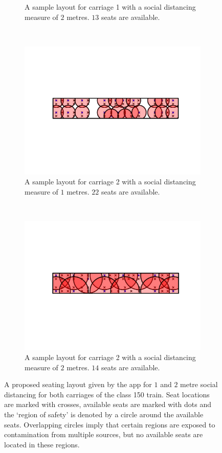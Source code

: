 \documentclass[11pt,a4paper]{article}
\begin{document}
\begin{figure}[ht!]
\begin{subfigure}[h]{0.490\linewidth}
\caption{A sample layout for carriage 1 with a social distancing measure of $2$ metres. $13$ seats are available.}
\label{TwoMetre1}
\end{subfigure}
~
\begin{subfigure}[h]{0.49\linewidth}
\centering
\includegraphics[width = \linewidth]{class150_second_car_1m.png}
\caption{A sample layout for carriage 2 with a social distancing measure of $1$ metres. $22$ seats are available.}
\label{OneMetre2}
\end{subfigure}
~
\begin{subfigure}[h]{0.490\linewidth}
\centering
\includegraphics[width = \linewidth]{class150_second_car_2m.png}
\caption{A sample layout for carriage 2 with a social distancing measure of $2$ metres. $14$ seats are available.}
\label{TwoMetre2}
\end{subfigure}
\caption{A proposed seating layout given by the app for $1$ and $2$ metre social distancing for both carriages of the class 150 train. Seat locations are marked with crosses, available seats are marked with dots and the `region of safety' is denoted by a circle around the available seats. Overlapping circles imply that certain regions are exposed to contamination from multiple sources, but no available seats are located in these regions. }
\label{Demonstration_pics}
\end{figure}
\end{document}
